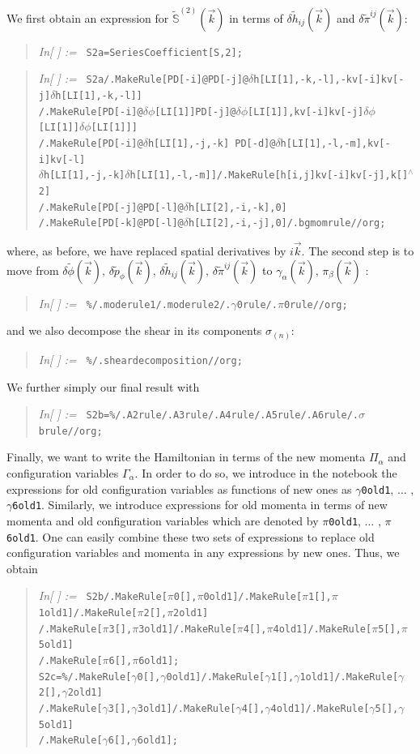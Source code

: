 \documentclass[11pt,tightenlines,eqsecnum,floats,aps,amsmath,amssymb,nofootinbib,prd,floatfix]{revtex4}
\def\t{\tilde}
\def\t{\tilde}
\newcommand{\<}{\langle}
\renewcommand{\>}{\rangle}
\newcounter{inout}
\newcommand{\inoutput}{%
	\stepcounter{inout}%
	\theinout}
\newcommand{\mathIn}[1]{
	\begin{quotation}\hspace*{-2.5cm} {\em In[\inoutput] :=\ } {\tt #1} \end{quotation}}
\begin{document}
We first obtain an expression for  $\tilde{\mathbb{S}}^{(2)}(\vec k)$ in terms of  $\delta \tilde{h}_{ij}(\vec k)$ and $\delta \tilde{\pi}^{ij}(\vec k)$:
%
\mathIn{S2a=SeriesCoefficient[S,2];}
%
\mathIn{S2a/.MakeRule[{PD[-i]@PD[-j]@$\delta$h[LI[1],-k,-l],-kv[-i]kv[-j]$\delta$h[LI[1],-k,-l]}]\\
/.MakeRule[{PD[-i]@$\delta\phi$[LI[1]]PD[-j]@$\delta\phi$[LI[1]],kv[-i]kv[-j]$\delta\phi$[LI[1]]$\delta\phi$[LI[1]]}]\\
/.MakeRule[{PD[-i]@$\delta$h[LI[1],-j,-k] PD[-d]@$\delta$h[LI[1],-l,-m],kv[-i]kv[-l]\\
$\delta$h[LI[1],-j,-k]$\delta$h[LI[1],-l,-m]}]/.MakeRule[{h[i,j]kv[-i]kv[-j],k[]$^\wedge$2}]\\
/.MakeRule[{PD[-j]@PD[-l]@$\delta$h[LI[2],-i,-k],0}]\\
/.MakeRule[{PD[-k]@PD[-l]@$\delta$h[LI[2],-i,-j],0}]/.bgmomrule//org;}
%
where, as before, we have replaced spatial derivatives by $i\vec k$. The second step is to move from $\delta \t{\phi}(\vec{k}),\, \delta \t{p}_{\phi}(\vec{k}),\, \delta \tilde{h}_{ij}(\vec k),\,  \delta \tilde{\pi}^{ij}(\vec k)$ to $\gamma_\alpha(\vec k),\, \pi_\beta(\vec k)$ :
%
\mathIn{\%/.moderule1/.moderule2/.$\gamma$0rule/.$\pi$0rule//org;}
%
and we also decompose the shear in its components $\sigma_{(n)}$:
%
\mathIn{\%/.sheardecomposition//org;}
%
We further simply our final result with
%
\mathIn{S2b=\%/.A2rule/.A3rule/.A4rule/.A5rule/.A6rule/.$\sigma$brule//org;}
%
Finally, we  want to write the Hamiltonian in terms of the new  momenta $\Pi_{\alpha}$ and configuration variables $\Gamma_{\alpha}$. In order to do so, we introduce in the notebook the expressions for old configuration variables as functions of new ones as {\tt $\gamma$0old1}, $\ldots$ , {\tt $\gamma$6old1}. Similarly, we introduce expressions for old momenta in terms of new momenta and old configuration variables which are denoted by {\tt $\pi$0old1}, $\ldots$ , {\tt $\pi$6old1}. One can easily combine these two sets of expressions to replace old configuration variables and momenta in any expressions by new ones. Thus, we obtain
%
\mathIn{S2b/.MakeRule[{$\pi$0[],$\pi$0old1}]/.MakeRule[{$\pi$1[],$\pi$1old1}]/.MakeRule[{$\pi$2[],$\pi$2old1}]\\
/.MakeRule[{$\pi$3[],$\pi$3old1}]/.MakeRule[{$\pi$4[],$\pi$4old1}]/.MakeRule[{$\pi$5[],$\pi$5old1}]\\
/.MakeRule[{$\pi$6[],$\pi$6old1}];\\
S2c=\%/.MakeRule[{$\gamma$0[],$\gamma$0old1}]/.MakeRule[{$\gamma$1[],$\gamma$1old1}]/.MakeRule[{$\gamma$2[],$\gamma$2old1}]\\
/.MakeRule[{$\gamma$3[],$\gamma$3old1}]/.MakeRule[{$\gamma$4[],$\gamma$4old1}]/.MakeRule[{$\gamma$5[],$\gamma$5old1}]\\/.MakeRule[{$\gamma$6[],$\gamma$6old1}];}
\end{document}
